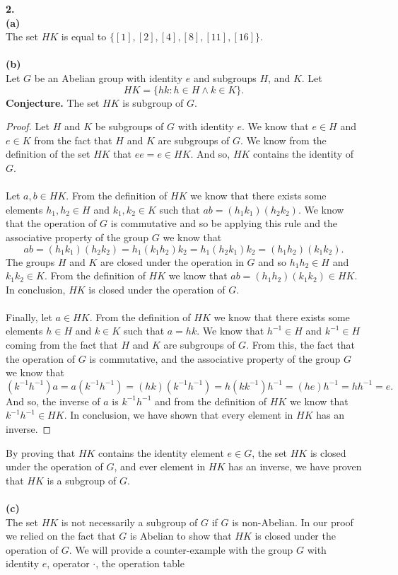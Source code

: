 \documentclass[11pt,a4paper]{article}
\begin{document}
{\bf 2.}\\
{\bf (a)}\\
The set $HK$ is equal to $\{[1],[2],[4],[8],[11],[16]\}$.\\
~\\
{\bf (b)}\\
Let $G$ be an Abelian group with identity $e$ and subgroups $H$, and $K$. Let 
\[HK = \{hk:h\in H \land k\in K\}.\]
{\bf Conjecture.} The set $HK$ is subgroup of $G$.
\begin{proof}
Let $H$ and $K$ be subgroups of $G$ with identity $e$. We know that $e\in H$ and $e\in K$ from the fact that $H$ and $K$ are subgroups of $G$. We know from the definition of the set $HK$ that $ee = e\in HK$. And so, $HK$ contains the identity of $G$.\\
~\\
Let $a,b \in HK$. From the definition of $HK$ we know that there exists some elements $h_1,h_2\in H$ and $k_1,k_2\in K$ such that $ab = (h_1k_1)(h_2k_2)$. We know that the operation of $G$ is commutative and so be applying this rule and the associative property of the group $G$ we know that 
\[ab = (h_1k_1)(h_2k_2) = h_1(k_1h_2)k_2 = h_1(h_2k_1)k_2 = (h_1h_2)(k_1k_2). \]
The groups $H$ and $K$ are closed under the operation in $G$ and so $h_1h_2\in H$ and $k_1k_2 \in K$. From the definition of $HK$ we know that $ab =(h_1h_2)(k_1k_2)\in HK $. In conclusion, $HK$ is closed under the operation of $G$.\\
~\\
Finally, let $a\in HK$. From the definition of $HK$ we know that there exists some elements $h\in H$ and $k\in K$ such that $a = hk$. We know that $h^{-1}\in H$ and $k^{-1}\in H$ coming from the fact that $H$ and $K$ are subgroups of $G$. From this, the fact that the operation of $G$ is commutative, and the associative property of the group $G$ we know that
\[(k^{-1}h^{-1})a = a(k^{-1}h^{-1}) = (hk)(k^{-1}h^{-1}) = h(kk^{-1})h^{-1} = (he)h^{-1} = hh^{-1} = e. \]
And so, the inverse of $a$ is $k^{-1}h^{-1}$ and from the definition of $HK$ we know that $k^{-1}h^{-1} \in HK$. In conclusion, we have shown that every element in $HK$ has an inverse.
\end{proof}
By proving that $HK$ contains the identity element $e\in G$, the set $HK$ is closed under the operation of $G$, and ever element in $HK$ has an inverse, we have proven that $HK$ is a subgroup of $G$.\\
~\\
{\bf (c)}\\
The set $HK$ is not necessarily a subgroup of $G$ if $G$ is non-Abelian. In our proof we relied on the fact that $G$ is Abelian to show that $HK$ is closed under the operation of $G$. We will provide a counter-example with the group $G$ with identity $e$, operator $\cdot$, the operation table
\end{document}
